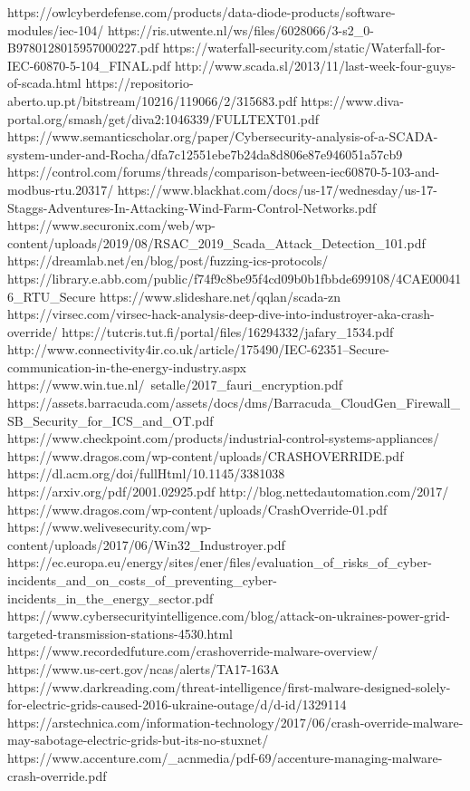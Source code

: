 https://owlcyberdefense.com/products/data-diode-products/software-modules/iec-104/
https://ris.utwente.nl/ws/files/6028066/3-s2_0-B9780128015957000227.pdf
https://waterfall-security.com/static/Waterfall-for-IEC-60870-5-104_FINAL.pdf
http://www.scada.sl/2013/11/last-week-four-guys-of-scada.html
https://repositorio-aberto.up.pt/bitstream/10216/119066/2/315683.pdf
https://www.diva-portal.org/smash/get/diva2:1046339/FULLTEXT01.pdf
https://www.semanticscholar.org/paper/Cybersecurity-analysis-of-a-SCADA-system-under-and-Rocha/dfa7c12551ebe7b24da8d806e87e946051a57cb9
https://control.com/forums/threads/comparison-between-iec60870-5-103-and-modbus-rtu.20317/
https://www.blackhat.com/docs/us-17/wednesday/us-17-Staggs-Adventures-In-Attacking-Wind-Farm-Control-Networks.pdf
https://www.securonix.com/web/wp-content/uploads/2019/08/RSAC_2019_Scada_Attack_Detection_101.pdf
https://dreamlab.net/en/blog/post/fuzzing-ics-protocols/
https://library.e.abb.com/public/f74f9c8be95f4cd09b0b1fbbde699108/4CAE000416_RTU_Secure%
https://www.slideshare.net/qqlan/scada-zn
https://virsec.com/virsec-hack-analysis-deep-dive-into-industroyer-aka-crash-override/
https://tutcris.tut.fi/portal/files/16294332/jafary_1534.pdf
http://www.connectivity4ir.co.uk/article/175490/IEC-62351--Secure-communication-in-the-energy-industry.aspx
https://www.win.tue.nl/~setalle/2017_fauri_encryption.pdf
https://assets.barracuda.com/assets/docs/dms/Barracuda_CloudGen_Firewall_SB_Security_for_ICS_and_OT.pdf
https://www.checkpoint.com/products/industrial-control-systems-appliances/
https://www.dragos.com/wp-content/uploads/CRASHOVERRIDE.pdf
https://dl.acm.org/doi/fullHtml/10.1145/3381038
https://arxiv.org/pdf/2001.02925.pdf
http://blog.nettedautomation.com/2017/
https://www.dragos.com/wp-content/uploads/CrashOverride-01.pdf
https://www.welivesecurity.com/wp-content/uploads/2017/06/Win32_Industroyer.pdf
https://ec.europa.eu/energy/sites/ener/files/evaluation_of_risks_of_cyber-incidents_and_on_costs_of_preventing_cyber-incidents_in_the_energy_sector.pdf
https://www.cybersecurityintelligence.com/blog/attack-on-ukraines-power-grid-targeted-transmission-stations-4530.html
https://www.recordedfuture.com/crashoverride-malware-overview/
https://www.us-cert.gov/ncas/alerts/TA17-163A
https://www.darkreading.com/threat-intelligence/first-malware-designed-solely-for-electric-grids-caused-2016-ukraine-outage/d/d-id/1329114
https://arstechnica.com/information-technology/2017/06/crash-override-malware-may-sabotage-electric-grids-but-its-no-stuxnet/
https://www.accenture.com/_acnmedia/pdf-69/accenture-managing-malware-crash-override.pdf
